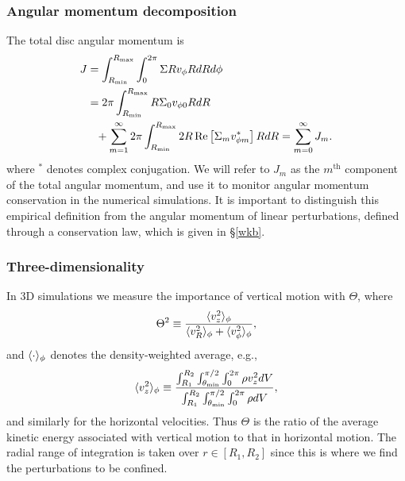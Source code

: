 \subsubsection{Angular momentum decomposition}
The total disc angular momentum is
\begin{align}
  J &= \int_{R_\mathrm{min}}^{R_\mathrm{max}}\int_0^{2\pi} \Sigma Rv_\phi RdRd\phi \notag\\
  &= 2\pi\int_{R_\mathrm{min}}^{R_\mathrm{max}} R\Sigma_0 v_{\phi0} R dR \notag\\ 
  &\phantom{=}+
  \sum_{m=1}^\infty2\pi\int_{R_\mathrm{min}}^{R_\mathrm{max}} 2R\operatorname{Re}\left[\Sigma_m v_{\phi
      m}^*\right] RdR 
  = \sum_{m=0}^\infty J_m. 
\end{align}
where $^*$ denotes complex conjugation. We will refer to $J_m$ as the
$m^\mathrm{th}$ component of the total angular momentum, and use it to
monitor angular momentum conservation in the numerical simulations. 
It is important to distinguish this empirical definition from the
angular momentum of linear perturbations, defined through a
conservation law, which is given in \S\ref{wkb}. 


\subsubsection{Three-dimensionality}
In 3D simulations we measure the importance of vertical motion with
$\Theta$, where 
\begin{align}\label{theta}
  \Theta^2 \equiv \frac{\langle v_z^2 \rangle_\phi}{\langle v_R^2 \rangle_\phi+\langle v_\phi^2 \rangle_\phi}, 
\end{align}
and $\langle \cdot \rangle_\phi$ denotes the density-weighted average, e.g., 
\begin{align}
  \langle v_z^2 \rangle_\phi \equiv\frac{
    \int_{R_1}^{R_2}\int_{\theta_\mathrm{min}}^{\pi/2} \int_{0}^{2\pi}
    \rho v_z^2 dV}{
    \int_{R_1}^{R_2}\int_{\theta_\mathrm{min}}^{\pi/2} \int_{0}^{2\pi}
    \rho dV
  },
\end{align}
and similarly for the horizontal velocities. Thus $\Theta$ is the
ratio of the average kinetic energy associated with vertical motion to
that in horizontal motion. The radial range of
integration is taken over $r\in[R_1,R_2]$ since this is where
we find the perturbations to be confined. 

